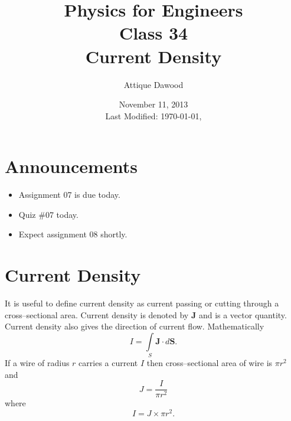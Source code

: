 \documentclass[12pt,a4paper]{article}
\title{\vspace{-3cm}Physics for Engineers\\Class 34\\Current Density}
\author{Attique Dawood}
\date{November 11, 2013\\[0.2cm] Last Modified: \today, \currenttime}
\begin{document}
\maketitle
\section{Announcements}
\begin{itemize}
\item Assignment 07 is due today.
\item Quiz \#07 today.
\item Expect assignment 08 shortly.
\end{itemize}
\section{Current Density}
It is useful to define current density as current passing or cutting through a cross--sectional area. Current density is denoted by \textbf{J} and is a vector quantity. Current density also gives the direction of current flow. Mathematically
\begin{equation}
I=\int\limits_{S}\textbf{J}\cdot d{\textbf{S}}.
\end{equation}
If a wire of radius $r$ carries a current $I$ then cross--sectional area of wire is $\pi r^2$ and
\begin{equation}
J=\dfrac{I}{\pi r^2}
\end{equation}
where
\begin{equation}
I=J\times\pi r^2.
\end{equation}
\newpage
\end{document}
